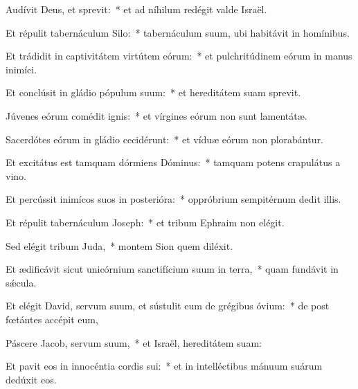 
\item Audívit Deus, et sprevit:~* et ad níhilum redégit valde Israël.

\item Et répulit tabernáculum Silo:~* tabernáculum suum, ubi habitávit in homínibus.

\item Et trádidit in captivitátem virtútem eórum:~* et pulchritúdinem eórum in manus inimíci.

\item Et conclúsit in gládio pópulum suum:~* et hereditátem suam sprevit.

\item Júvenes eórum comédit ignis:~* et vírgines eórum non sunt lamentátæ.

\item Sacerdótes eórum in gládio cecidérunt:~* et víduæ eórum non plorabántur.

\item Et excitátus est tamquam dórmiens Dóminus:~* tamquam potens crapulátus a vino.

\item Et percússit inimícos suos in posterióra:~* oppróbrium sempitérnum dedit illis.

\item Et répulit tabernáculum Joseph:~* et tribum Ephraim non elégit.

\item Sed elégit tribum Juda,~* montem Sion quem diléxit.

\item Et ædificávit sicut unicórnium sanctifícium suum in terra,~* quam fundávit in sǽcula.

\item Et elégit David, servum suum, et sústulit eum de grégibus óvium:~* de post fœtántes accépit eum,

\item Páscere Jacob, servum suum,~* et Israël, hereditátem suam:

\item Et pavit eos in innocéntia cordis sui:~* et in intelléctibus mánuum suárum dedúxit eos.